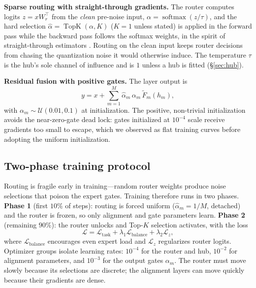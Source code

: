 \documentclass[10pt]{article}
\newcommand{\topk}{\operatorname{TopK}}
\newcommand{\softmax}{\operatorname{softmax}}
\theoremstyle{definition}
\theoremstyle{plain}
\theoremstyle{remark}
\begin{document}
\textbf{Sparse routing with straight-through gradients.} The router computes logits $z = x W_r^\top$ from the \emph{clean} pre-noise input, $\alpha = \softmax(z/\tau)$, and the hard selection $\hat\alpha = \topk(\alpha, K)$ ($K{=}1$ unless stated) is applied in the forward pass while the backward pass follows the softmax weights, in the spirit of straight-through estimators \citep{bengio2013}. Routing on the clean input keeps router decisions from chasing the quantization noise it would otherwise induce. The temperature $\tau$ is the hub's sole channel of influence and is $1$ unless a hub is fitted (\S\ref{sec:hub}).

\textbf{Residual fusion with positive gates.} The layer output is
\begin{equation}
\label{eq:fuse}
y = x + \sum_{m=1}^{M} \hat\alpha_m \, \alpha_m \, \tilde F_m(h_m),
\end{equation}
with $\alpha_m \sim \mathcal{U}(0.01, 0.1)$ at initialization. The positive, non-trivial initialization avoids the near-zero-gate dead lock: gates initialized at $10^{-4}$ scale receive gradients too small to escape, which we observed as flat training curves before adopting the uniform initialization.

\subsection{Two-phase training protocol}
\label{sec:training}

Routing is fragile early in training---random router weights produce noise selections that poison the expert gates. Training therefore runs in two phases. \textbf{Phase 1} (first $10\%$ of steps): routing is forced uniform ($\hat\alpha_m = 1/M$, detached) and the router is frozen, so only alignment and gate parameters learn. \textbf{Phase 2} (remaining $90\%$): the router unlocks and Top-$K$ selection activates, with the loss
\begin{equation}
\label{eq:loss}
\mathcal{L} = \mathcal{L}_{\text{task}} + \lambda_1 \mathcal{L}_{\text{balance}} + \lambda_2 \mathcal{L}_{z},
\end{equation}
where $\mathcal{L}_{\text{balance}}$ encourages even expert load and $\mathcal{L}_{z}$ regularizes router logits. Optimizer groups isolate learning rates: $10^{-4}$ for the router and hub, $10^{-2}$ for alignment parameters, and $10^{-3}$ for the output gates $\alpha_m$. The router must move slowly because its selections are discrete; the alignment layers can move quickly because their gradients are dense.
\end{document}
